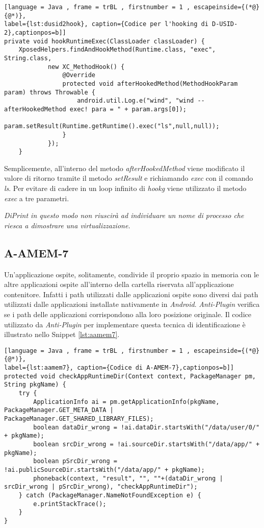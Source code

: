 \begin{lstlisting}[language = Java , frame = trBL , firstnumber = 1 , escapeinside={(*@}{@*)},
label={lst:dusid2hook}, caption={Codice per l'hooking di D-USID-2},captionpos=b]]
private void hookRuntimeExec(ClassLoader classLoader) {
    XposedHelpers.findAndHookMethod(Runtime.class, "exec", String.class,
            new XC_MethodHook() {
                @Override
                protected void afterHookedMethod(MethodHookParam param) throws Throwable {
                    android.util.Log.e("wind", "wind -- afterHookedMethod exec! para = " + param.args[0]);
                    param.setResult(Runtime.getRuntime().exec("ls",null,null));
                }
            });
    }

\end{lstlisting}

Semplicemente, all'interno del metodo \emph{afterHookedMethod} viene modificato il valore di ritorno tramite il metodo \emph{setResult} e richiamando \emph{exec} con il comando \emph{ls}.
Per evitare di cadere in un loop infinito di \emph{\gls{hookg}} viene utilizzato il metodo \emph{exec} a tre parametri.

\emph{DiPrint in questo modo non riuscirà ad individuare un nome di processo che riesca a dimostrare una virtualizzazione.}

\newpage

\subsection*{A-AMEM-7}
\label{a-amen-7}

Un'applicazione ospite, solitamente, condivide il proprio spazio in memoria con le altre applicazioni ospite all'interno della cartella riservata all'applicazione contenitore. Infatti i path utilizzati dalle applicazioni ospite sono diversi dai path utilizzati dalle applicazioni installate nativamente in \emph{Android}. \emph{Anti-Plugin} verifica se i path delle applicazioni corrispondono alla loro posizione originale. 
Il codice utilizzato da \emph{Anti-Plugin} per implementare questa tecnica di identificazione è illustrato nello Snippet \ref{lst:aamem7}.

\begin{lstlisting}[language = Java , frame = trBL , firstnumber = 1 , escapeinside={(*@}{@*)},
label={lst:aamem7}, caption={Codice di A-AMEM-7},captionpos=b]]
protected void checkAppRuntimeDir(Context context, PackageManager pm, String pkgName) {
    try {
        ApplicationInfo ai = pm.getApplicationInfo(pkgName, PackageManager.GET_META_DATA | PackageManager.GET_SHARED_LIBRARY_FILES);
        boolean dataDir_wrong = !ai.dataDir.startsWith("/data/user/0/" + pkgName);
        boolean srcDir_wrong = !ai.sourceDir.startsWith("/data/app/" + pkgName);
        boolean pSrcDir_wrong = !ai.publicSourceDir.startsWith("/data/app/" + pkgName);
        phoneback(context, "result", "", ""+(dataDir_wrong | srcDir_wrong | pSrcDir_wrong), "checkAppRuntimeDir");
    } catch (PackageManager.NameNotFoundException e) {
        e.printStackTrace();
    }
}
\end{lstlisting}

